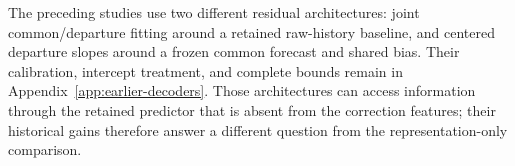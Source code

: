 The preceding studies use two different residual architectures:
joint common/departure fitting around a retained raw-history
baseline, and centered departure slopes around a frozen common
forecast and shared bias. Their calibration, intercept treatment,
and complete bounds remain in Appendix~\ref{app:earlier-decoders}.
Those architectures can access information through the retained
predictor that is absent from the correction features; their
historical gains therefore answer a different question from the
representation-only comparison.
